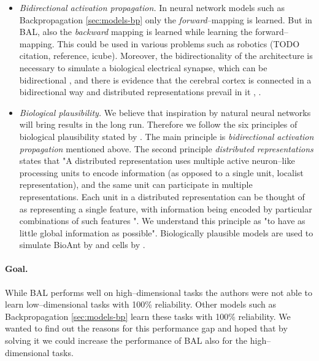 \begin{itemize} 

\item \emph{Bidirectional activation propagation.} In neural network models such as Backpropagation \ref{sec:models-bp} only the \emph{forward}--mapping is learned. But in BAL, also the \emph{backward} mapping is learned while learning the forward--mapping. This could be used in various problems such as robotics (TODO citation, reference, icube). Moreover, the bidirectionality of the architecture is necessary to simulate a biological electrical synapse, which can be bidirectional \citep{kandel1995essentials}, \citep{rosa2002biologically} and there is evidence that the cerebral cortex is connected in a bidirectional way and distributed representations prevail in it \citep{o2000computational}, \citep{da2011advances}. 

\item \emph{Biological plausibility.} We believe that inspiration by natural neural networks will bring results in the long run. Therefore we follow the six principles of biological plausibility stated by \citet{hinton1988learning}. The main principle is \emph{bidirectional activation propagation} mentioned above. The second principle \emph{distributed representations} states that "A distributed representation uses multiple active neuron--like processing units to encode information (as opposed to a single unit, localist representation), and the same unit can participate in multiple representations. Each unit in a distributed representation can be thought of as representing a single feature, with information being encoded by particular combinations of such features \citep{hinton1988learning}". We understand this principle as "to have as little global information as possible". Biologically plausible models are used to simulate BioAnt by \citet{schneider2009application} and cells by \citet{nawrocki2012monitoring}. 

\end{itemize} 

\paragraph{Goal.}
While BAL performs well on high--dimensional tasks the authors were not able to learn low--dimensional tasks with 100\% reliability. Other models such as Backpropagation \citep{rumelhart1986learning} \ref{sec:models-bp} learn these tasks with 100\% reliability. We wanted to find out the reasons for this performance gap and hoped that by solving it we could increase the performance of BAL also for the high--dimensional tasks. 

